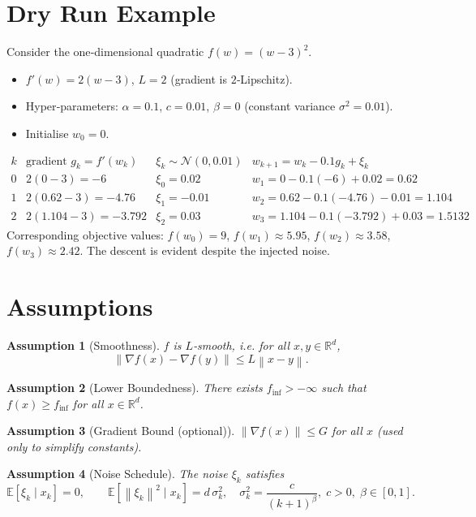 \documentclass{article}
\newtheorem{assumption}{Assumption}
\newcommand{\E}{\mathbb{E}}
\newcommand{\norm}[1]{\left\lVert #1\right\rVert}
\newcommand{\R}{\mathbb{R}}
\begin{document}
\section*{Dry Run Example}
Consider the one‑dimensional quadratic $f(w)=(w-3)^{2}$.
\begin{itemize}
\item $f'(w)=2(w-3)$, $L=2$ (gradient is $2$‑Lipschitz).
\item Hyper‑parameters: $\alpha=0.1$, $c=0.01$, $\beta=0$ (constant variance $\sigma^{2}=0.01$).
\item Initialise $w_{0}=0$.
\end{itemize}
\[
\begin{array}{c|c|c|c}
k & \text{gradient }g_{k}=f'(w_{k}) & \xi_{k}\sim\mathcal N(0,0.01) & w_{k+1}=w_{k}-0.1 g_{k}+\xi_{k}\\ \hline
0 & 2(0-3)=-6 & \xi_{0}=0.02 & w_{1}=0-0.1(-6)+0.02=0.62\\
1 & 2(0.62-3)=-4.76 & \xi_{1}=-0.01 & w_{2}=0.62-0.1(-4.76)-0.01=1.104\\
2 & 2(1.104-3)=-3.792 & \xi_{2}=0.03 & w_{3}=1.104-0.1(-3.792)+0.03=1.5132
\end{array}
\]
Corresponding objective values: $f(w_{0})=9$, $f(w_{1})\approx5.95$, $f(w_{2})\approx3.58$, $f(w_{3})\approx2.42$.
The descent is evident despite the injected noise.

\newpage
\section*{Assumptions}
\begin{assumption}[Smoothness]
$f$ is $L$‑smooth, i.e. for all $x,y\in\R^{d}$,
\[
\norm{\nabla f(x)-\nabla f(y)}\le L\norm{x-y}.
\tag{A1}
\]
\end{assumption}
\begin{assumption}[Lower Boundedness]
There exists $f_{\inf}>-\infty$ such that $f(x)\ge f_{\inf}$ for all $x\in\R^{d}$.
\end{assumption}
\begin{assumption}[Gradient Bound (optional)]
$\norm{\nabla f(x)}\le G$ for all $x$ (used only to simplify constants).
\end{assumption}
\begin{assumption}[Noise Schedule]
The noise $\xi_{k}$ satisfies 
\[
\E[\xi_{k}\mid x_{k}]=0,\qquad 
\E[\norm{\xi_{k}}^{2}\mid x_{k}]=d\,\sigma_{k}^{2},
\quad \sigma_{k}^{2}= \frac{c}{(k+1)^{\beta}},\;c>0,\;\beta\in[0,1].
\tag{A4}
\]
\end{assumption}
\end{document}
